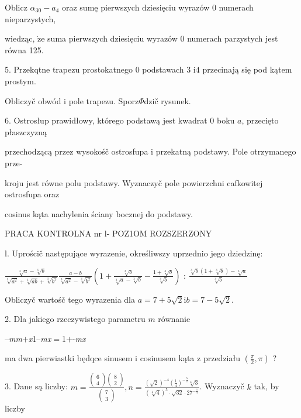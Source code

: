 \documentclass[a4paper,12pt]{article}
\begin{document}
Oblicz $\alpha_{30}-a_{4}$ oraz sumę pierwszych dziesięciu wyrazów $0$ numerach nieparzystych,

wiedząc, $\dot{\mathrm{z}}\mathrm{e}$ suma pierwszych dziesięciu wyrazów $0$ numerach parzystych jest równa 125.

5. Przekqtne trapezu prostokatnego $0$ podstawach 3 $\mathrm{i}4$ przecinają się pod kątem prostym.

Obliczyč obwód $\mathrm{i}$ pole trapezu. Sporz$\Phi$dzič rysunek.

6. Ostrosłup prawidłowy, którego podstawą jest kwadrat $0$ boku $a$, przecięto płaszczyzną

przechodzącą przez wysokośč ostrosfupa $\mathrm{i}$ przekatną podstawy. Pole otrzymanego prze-

kroju jest równe polu podstawy. Wyznaczyč pole powierzchni cafkowitej ostrosfupa oraz

cosinus kąta nachylenia ściany bocznej do podstawy.




PRACA KONTROLNA nr l- POZ1OM ROZSZERZONY

l. Uprościč następujące wyrazenie, określiwszy uprzednio jego dziedzinę:

$\displaystyle \frac{\sqrt[3]{a}-\sqrt[3]{b}}{\sqrt[3]{a^{2}}+\sqrt[3]{ab}+\sqrt[3]{b^{2}}} \displaystyle \frac{a-b}{\sqrt[3]{a^{2}}-\sqrt[3]{b^{2}}} (1+\displaystyle \frac{\sqrt[3]{b}}{\sqrt[3]{a}-\sqrt[3]{b}}-\frac{1+\sqrt[3]{b}}{\sqrt[3]{b}})$ : $\displaystyle \frac{\sqrt[3]{b}(1+\sqrt[3]{b})-\sqrt[3]{a}}{\sqrt[3]{b}}$

Obliczyč wartośč tego wyrazenia dla $a=7+5\sqrt{2} \mathrm{i} b=7-5\sqrt{2}.$

2. Dla jakiego rzeczywistego parametru $m$ równanie

--{\it mm}$+${\it x}1--{\it mx}$=$1$+$-{\it mx}

ma dwa pierwiastki będqce sinusem $\mathrm{i}$ cosinusem kąta $\mathrm{z}$ przedziału $(\displaystyle \frac{\pi}{2},\pi)$ ?

3. Dane są liczby: $m= \displaystyle \frac{\left(\begin{array}{l}
6\\
4
\end{array}\right)\left(\begin{array}{l}
8\\
2
\end{array}\right)}{\left(\begin{array}{l}
7\\
3
\end{array}\right)}, n= \displaystyle \frac{(\sqrt{2})^{-4}(\frac{1}{4})^{-\frac{5}{2}}\sqrt[4]{3}}{(\sqrt[4]{4})^{5}\cdot\sqrt{32}\cdot 27^{-\frac{1}{4}}}$. Wyznaczyč $k$ tak, by liczby
\end{document}
